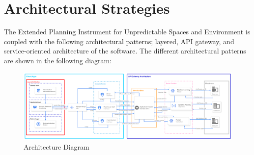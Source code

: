 \documentclass{article}
\begin{document}
\section{Architectural Strategies}
The Extended Planning Instrument for Unpredictable Spaces and Environment is coupled with the following architectural patterns; layered, API gateway, and service-oriented architecture of the software. The different architectural patterns are shown in the following diagram:

\begin{figure}[h]
    \centering
    \includegraphics[width=\textwidth]{architecturalDiagram.png}
    \caption{Architecture Diagram}
    \label{fig:arch_diagram}
\end{figure}
\end{document}
